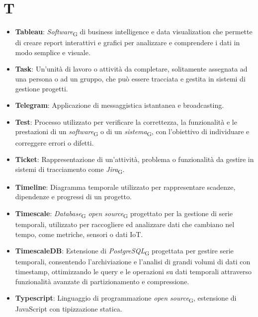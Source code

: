 \section{T}
\begin{itemize}
    \item \textbf{Tableau}: \textit{Software}\textsubscript{G} di business intelligence e data visualization che permette di creare report interattivi e grafici per analizzare e comprendere i dati in modo semplice e visuale.
    \item \textbf{Task}: Un'unità di lavoro o attività da completare, solitamente assegnata ad una persona o ad un gruppo, che può essere tracciata e gestita in sistemi di gestione progetti.
    \item \textbf{Telegram}: Applicazione di messaggistica istantanea e broadcasting.
    \item \textbf{Test}: Processo utilizzato per verificare la correttezza, la funzionalità e le prestazioni di un \textit{software}\textsubscript{G} o di un \textit{sistema}\textsubscript{G}, con l'obiettivo di individuare e correggere errori o difetti.
    \item \textbf{Ticket}: Rappresentazione di un’attività, problema o funzionalità da gestire in sistemi di tracciamento come \textit{Jira}\textsubscript{G}.
    \item \textbf{Timeline}: Diagramma temporale utilizzato per rappresentare scadenze, dipendenze e progressi di un progetto.
    \item \textbf{Timescale}: \textit{Database}\textsubscript{G} \textit{open source}\textsubscript{G} progettato per la gestione di serie temporali, utilizzato per raccogliere ed analizzare dati che cambiano nel tempo, come metriche, sensori o dati IoT.
    \item \textbf{TimescaleDB}: Estensione di \textit{PostgreSQL}\textsubscript{G} progettata per gestire serie temporali, consentendo l'archiviazione e l'analisi di grandi volumi di dati con timestamp, ottimizzando le query e le operazioni su dati temporali attraverso funzionalità avanzate di partizionamento e compressione.
    \item \textbf{Typescript}: Linguaggio di programmazione \textit{open source}\textsubscript{G}, estensione di JavaScript con tipizzazione statica.
\end{itemize}
